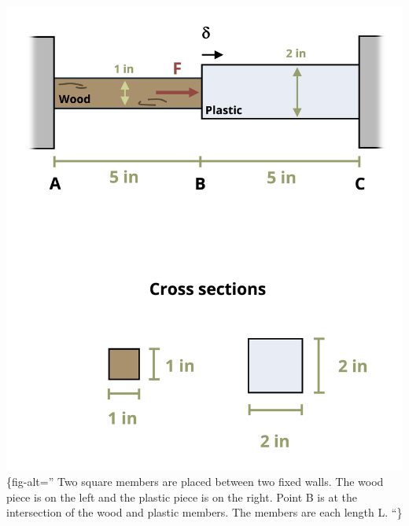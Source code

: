 \documentclass[
  letterpaper,
  DIV=11,
  numbers=noendperiod]{scrreprt}
\begin{document}
\includegraphics{images/246.png}\{fig-alt='' Two square members are
placed between two fixed walls. The wood piece is on the left and the
plastic piece is on the right. Point B is at the intersection of the
wood and plastic members. The members are each length L. ``\}
\end{document}

